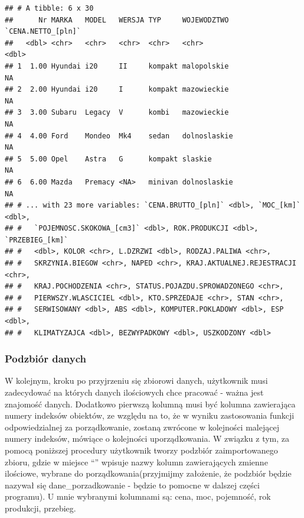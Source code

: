 \documentclass[12pt,a4paper]{report}
\begin{document}
{\begin{verbatim}
## # A tibble: 6 x 30
##      Nr MARKA   MODEL   WERSJA TYP     WOJEWODZTWO  `CENA.NETTO_[pln]`
##   <dbl> <chr>   <chr>   <chr>  <chr>   <chr>                     <dbl>
## 1  1.00 Hyundai i20     II     kompakt malopolskie                  NA
## 2  2.00 Hyundai i20     I      kompakt mazowieckie                  NA
## 3  3.00 Subaru  Legacy  V      kombi   mazowieckie                  NA
## 4  4.00 Ford    Mondeo  Mk4    sedan   dolnoslaskie                 NA
## 5  5.00 Opel    Astra   G      kompakt slaskie                      NA
## 6  6.00 Mazda   Premacy <NA>   minivan dolnoslaskie                 NA
## # ... with 23 more variables: `CENA.BRUTTO_[pln]` <dbl>, `MOC_[km]` <dbl>,
## #   `POJEMNOSC.SKOKOWA_[cm3]` <dbl>, ROK.PRODUKCJI <dbl>, `PRZEBIEG_[km]`
## #   <dbl>, KOLOR <chr>, L.DZRZWI <dbl>, RODZAJ.PALIWA <chr>,
## #   SKRZYNIA.BIEGOW <chr>, NAPED <chr>, KRAJ.AKTUALNEJ.REJESTRACJI <chr>,
## #   KRAJ.POCHODZENIA <chr>, STATUS.POJAZDU.SPROWADZONEGO <chr>,
## #   PIERWSZY.WLASCICIEL <dbl>, KTO.SPRZEDAJE <chr>, STAN <chr>,
## #   SERWISOWANY <dbl>, ABS <dbl>, KOMPUTER.POKLADOWY <dbl>, ESP <dbl>,
## #   KLIMATYZAJCA <dbl>, BEZWYPADKOWY <dbl>, USZKODZONY <dbl>
\end{verbatim}

\subsubsection{Podzbiór danych}\label{podzbior-danych}

W kolejnym, kroku po przyjrzeniu się zbiorowi danych, użytkownik musi
zadecydować na których danych ilościowych chce pracować - ważna jest
znajomość danych. Dodatkowo pierwszą kolumną musi być kolumna
zawierająca numery indeksów obiektów, ze względu na to, że w wyniku
zastosowania funkcji odpowiedzialnej za porządkowanie, zostaną zwrócone
w kolejności malejącej numery indeksów, mówiące o kolejności
uporządkowania. W związku z tym, za pomocą poniższej procedury
użytkownik tworzy podzbiór zaimportowanego zbioru, gdzie w miejsce ``''
wpisuje nazwy kolumn zawierających zmienne ilościowe, wybrane do
porządkowania(przyjmijmy założenie, że podzbiór będzie nazywał się
dane\_porzadkowanie - będzie to pomocne w dalszej części programu). U
mnie wybranymi kolumnami są: cena, moc, pojemność, rok produkcji,
przebieg.

\begin{Shaded}
\begin{Highlighting}[]
\NormalTok{dane_porzadkowanie<-zbior_danych[}\NormalTok{(}\NormalTok{,}\NormalTok{,}\NormalTok{,}
                                   \NormalTok{,}
                                  \NormalTok{,}\NormalTok{)]}
\end{Highlighting}
\end{Shaded}

}
\end{document}
